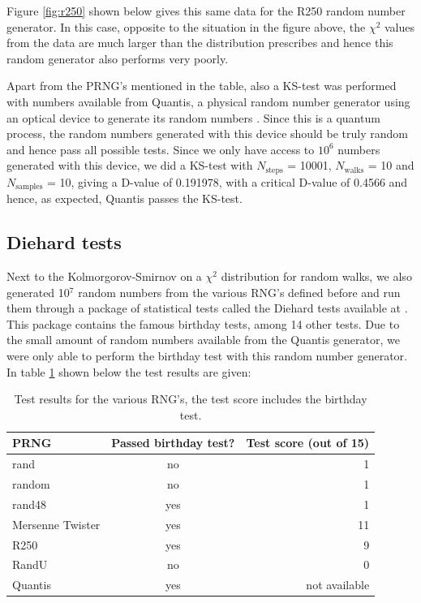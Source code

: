 \documentclass[10pt,a4paper]{article}
\begin{document}
\noindent Figure \ref{fig:r250} shown below gives this same data for the R250 random number generator. In this case, opposite to the situation in the figure above, the $\chi^2$ values from the data are much larger than the distribution prescribes and hence this random generator also performs very poorly.

\noindent Apart from the PRNG's mentioned in the table, also a KS-test was performed with numbers available from Quantis, a physical random number generator using an optical device to generate its random numbers \cite{quantis}. Since this is a quantum process, the random numbers generated with this device should be truly random and hence pass all possible tests. Since we only have access to $10^6$ numbers generated with this device, we did a KS-test with $N_{\text{steps}}$ = 10001, $N_{\text{walks}}$ = 10 and $N_{\text{samples}}$ = 10, giving a D-value of 0.191978, with a critical D-value of 0.4566 and hence, as expected, Quantis passes the KS-test.

\subsection{Diehard tests}
Next to the Kolmorgorov-Smirnov on a $\chi^2$ distribution for random walks, we also generated 10$^7$ random numbers from the various RNG's defined before and run them through a package of statistical tests called the Diehard tests available at \cite{diehard}. This package contains the famous birthday tests, among 14 other tests. Due to the small amount of random numbers available from the Quantis generator, we were only able to perform the birthday test with this random number generator. In table \ref{tab:diehard} shown below the test results are given:

\begin{center}
\begin{table}[H]
  \centering
\begin{tabular}{l c r}
\hline
PRNG & Passed birthday test? & Test score (out of 15)\\
\hline
rand &  no & 1\\
random &  no & 1\\
rand48 & yes & 1\\
Mersenne Twister & yes & 11\\
R250 & yes & 9\\
RandU & no & 0\\
Quantis & yes & not available \\
\hline
\end{tabular}
\caption[width=5.0cm]{Test results for the various RNG's, the test score includes the birthday test.}
\label{tab:diehard}
\end{table}
\end{center}
\end{document}
